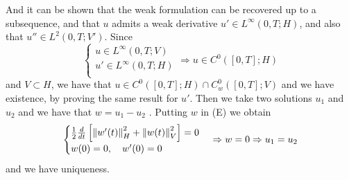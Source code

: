 \begin{enumerate}
\[          \]
          And it can be shown that the weak formulation can be recovered up to a
          subsequence, and that \(u\) admits a weak derivative \(u' \in L^\infty(0, T;
          H)\), and also that \(u'' \in L^2(0, T; V')\). Since
          \[
              \begin{cases}
                  u \in L^\infty(0, T; V)  \\
                  u' \in L^\infty(0, T; H) \\
              \end{cases}
              \Rightarrow u \in C^0([0, T]; H)
          \]
          and \(V \subset H\), we have that \(u \in C^0([0, T]; H) \cap C_w^0([0, T];
          V)\) and we have existence, by proving the same result for \(u'\). Then we take
          two solutions \(u_1\) and \(u_2\) and we have that \(w = u_1 - u_2\) . Putting
          \(w\) in (E) we obtain
          \[
              \begin{cases}
                  \frac{1}{2}\frac{d}{dt} \left[\norm{w'(t)}_H^2 + \norm{w(t)}_V^2\right] = 0 \\
                  w(0) = 0, \quad w'(0) = 0
              \end{cases}
              \Rightarrow w = 0 \Rightarrow u_1 = u_2
          \]
          and we have uniqueness.
\end{enumerate}

